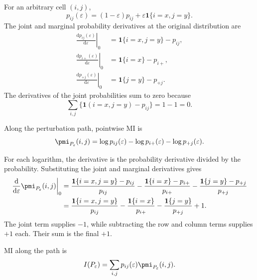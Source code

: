 For an arbitrary cell \((i,j)\),
\begin{equation}
  p_{ij}(\varepsilon)
  =(1-\varepsilon)p_{ij}
  +\varepsilon\mathbf 1\{i=x,j=y\}.
\end{equation}
The joint and marginal probability derivatives at the original distribution
are
\begin{align}
  \left.\frac{\mathrm d p_{ij}(\varepsilon)}{\mathrm d\varepsilon}
  \right|_{0}
  &=\mathbf 1\{i=x,j=y\}-p_{ij},
  \label{eq:joint-perturbation-derivative}\\
  \left.\frac{\mathrm d p_{i+}(\varepsilon)}{\mathrm d\varepsilon}
  \right|_{0}
  &=\mathbf 1\{i=x\}-p_{i+},\\
  \left.\frac{\mathrm d p_{+j}(\varepsilon)}{\mathrm d\varepsilon}
  \right|_{0}
  &=\mathbf 1\{j=y\}-p_{+j}.
\end{align}
The derivatives of the joint probabilities sum to zero because
\begin{equation}
  \sum_{i,j}
  \{\mathbf 1(i=x,j=y)-p_{ij}\}
  =1-1=0.
\end{equation}

\medskip
{}

Along the perturbation path, pointwise MI is
\begin{equation}
  \pmi_{P_\varepsilon}(i,j)
  =\log p_{ij}(\varepsilon)
  -\log p_{i+}(\varepsilon)
  -\log p_{+j}(\varepsilon).
\end{equation}
\begin{samepage}%
For each logarithm, the derivative is the probability derivative divided by
the probability. Substituting the joint and marginal derivatives gives
\begin{align}
  \left.
  \frac{\mathrm d}{\mathrm d\varepsilon}
  \pmi_{P_\varepsilon}(i,j)
  \right|_{0}
  &={}
  \frac{\mathbf 1\{i=x,j=y\}-p_{ij}}{p_{ij}}
  -\frac{\mathbf 1\{i=x\}-p_{i+}}{p_{i+}}
  -\frac{\mathbf 1\{j=y\}-p_{+j}}{p_{+j}}
  \notag\\*
  &={}
  \frac{\mathbf 1\{i=x,j=y\}}{p_{ij}}
  -\frac{\mathbf 1\{i=x\}}{p_{i+}}
  -\frac{\mathbf 1\{j=y\}}{p_{+j}}
  +1.
  \label{eq:pmi-derivative}
\end{align}
The joint term supplies \(-1\), while subtracting the row and column
terms supplies \(+1\) each. Their sum is the final \(+1\).
\par
\end{samepage}

MI along the path is
\begin{equation}
  I(P_\varepsilon)
  =\sum_{i,j}p_{ij}(\varepsilon)
  \pmi_{P_\varepsilon}(i,j).
\end{equation}


